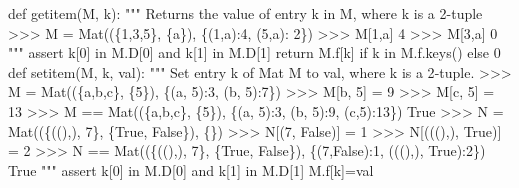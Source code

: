 \documentclass[
  letterpaper,
  DIV=11,
  numbers=noendperiod]{scrartcl}
\newenvironment{Shaded}{\begin{snugshade}}{\end{snugshade}}
\newcommand{\CommentTok}[1]{\textcolor[rgb]{0.37,0.37,0.37}{#1}}
\newcommand{\ControlFlowTok}[1]{\textcolor[rgb]{0.00,0.23,0.31}{#1}}
\newcommand{\DecValTok}[1]{\textcolor[rgb]{0.68,0.00,0.00}{#1}}
\newcommand{\KeywordTok}[1]{\textcolor[rgb]{0.00,0.23,0.31}{#1}}
\newcommand{\NormalTok}[1]{\textcolor[rgb]{0.00,0.23,0.31}{#1}}
\newcommand{\OperatorTok}[1]{\textcolor[rgb]{0.37,0.37,0.37}{#1}}
\begin{document}
\begin{Shaded}
\begin{Highlighting}[numbers=left,,]
\KeywordTok{def}\NormalTok{ getitem(M, k):}
    \CommentTok{"""}
\CommentTok{    Returns the value of entry k in M, where k is a 2{-}tuple}
\CommentTok{    \textgreater{}\textgreater{}\textgreater{} M = Mat((\{1,3,5\}, \{\textquotesingle{}a\textquotesingle{}\}), \{(1,\textquotesingle{}a\textquotesingle{}):4, (5,\textquotesingle{}a\textquotesingle{}): 2\})}
\CommentTok{    \textgreater{}\textgreater{}\textgreater{} M[1,\textquotesingle{}a\textquotesingle{}]}
\CommentTok{    4}
\CommentTok{    \textgreater{}\textgreater{}\textgreater{} M[3,\textquotesingle{}a\textquotesingle{}]}
\CommentTok{    0}
\CommentTok{    """}
    \ControlFlowTok{assert}\NormalTok{ k[}\DecValTok{0}\NormalTok{] }\KeywordTok{in}\NormalTok{ M.D[}\DecValTok{0}\NormalTok{] }\KeywordTok{and}\NormalTok{ k[}\DecValTok{1}\NormalTok{] }\KeywordTok{in}\NormalTok{ M.D[}\DecValTok{1}\NormalTok{]}
    \ControlFlowTok{return}\NormalTok{ M.f[k] }\ControlFlowTok{if}\NormalTok{ k }\KeywordTok{in}\NormalTok{ M.f.keys() }\ControlFlowTok{else} \DecValTok{0}
\KeywordTok{def}\NormalTok{ setitem(M, k, val):}
    \CommentTok{"""}
\CommentTok{    Set entry k of Mat M to val, where k is a 2{-}tuple.}
\CommentTok{    \textgreater{}\textgreater{}\textgreater{} M = Mat((\{\textquotesingle{}a\textquotesingle{},\textquotesingle{}b\textquotesingle{},\textquotesingle{}c\textquotesingle{}\}, \{5\}), \{(\textquotesingle{}a\textquotesingle{}, 5):3, (\textquotesingle{}b\textquotesingle{}, 5):7\})}
\CommentTok{    \textgreater{}\textgreater{}\textgreater{} M[\textquotesingle{}b\textquotesingle{}, 5] = 9}
\CommentTok{    \textgreater{}\textgreater{}\textgreater{} M[\textquotesingle{}c\textquotesingle{}, 5] = 13}
\CommentTok{    \textgreater{}\textgreater{}\textgreater{} M == Mat((\{\textquotesingle{}a\textquotesingle{},\textquotesingle{}b\textquotesingle{},\textquotesingle{}c\textquotesingle{}\}, \{5\}), \{(\textquotesingle{}a\textquotesingle{}, 5):3, (\textquotesingle{}b\textquotesingle{}, 5):9, (\textquotesingle{}c\textquotesingle{},5):13\})}
\CommentTok{    True}
\CommentTok{    \textgreater{}\textgreater{}\textgreater{} N = Mat((\{((),), 7\}, \{True, False\}), \{\})}
\CommentTok{    \textgreater{}\textgreater{}\textgreater{} N[(7, False)] = 1}
\CommentTok{    \textgreater{}\textgreater{}\textgreater{} N[(((),), True)] = 2}
\CommentTok{    \textgreater{}\textgreater{}\textgreater{} N == Mat((\{((),), 7\}, \{True, False\}), \{(7,False):1, (((),), True):2\})}
\CommentTok{    True}
\CommentTok{    """}
    \ControlFlowTok{assert}\NormalTok{ k[}\DecValTok{0}\NormalTok{] }\KeywordTok{in}\NormalTok{ M.D[}\DecValTok{0}\NormalTok{] }\KeywordTok{and}\NormalTok{ k[}\DecValTok{1}\NormalTok{] }\KeywordTok{in}\NormalTok{ M.D[}\DecValTok{1}\NormalTok{]}
\NormalTok{    M.f[k]}\OperatorTok{=}\NormalTok{val}


\end{Highlighting}
\end{Shaded}
\end{document}
